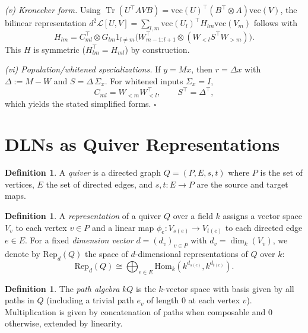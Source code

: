 \documentclass{article}
\theoremstyle{definition}
\newtheorem{definition}[theorem]{Definition}
\begin{document}
\smallskip
\emph{(v) Kronecker form.}
Using $\operatorname{Tr}(U^\top A V B)=\mathrm{vec}(U)^\top(B^\top\!\otimes A)\mathrm{vec}(V)$,
the bilinear representation $d^2\mathcal L[U,V]=\sum_{l,m}\mathrm{vec}(U_l)^\top H_{lm}\mathrm{vec}(V_m)$
follows with
\[
H_{lm}=C_{ml}^\top\!\otimes G_{lm}1_{l\neq m}\big(W_{m-1:l+1}^\top\!\otimes (W_{<l}S^\top W_{>m})\big).
\]
This $H$ is symmetric ($H_{lm}^\top=H_{ml}$) by construction.

\smallskip
\emph{(vi) Population/whitened specializations.}
If $y=Mx$, then $r=\Delta x$ with $\Delta:=M-W$ and $S=\Delta\,\Sigma_x$. For whitened inputs $\Sigma_x=I$,
\[
C_{ml}=W_{<m}W_{<l}^\top,\qquad S^\top=\Delta^\top,
\]
which yields the stated simplified forms. \hfill$\square$
\section{DLNs as Quiver Representations}
\begin{definition}
A \emph{quiver} is a directed graph $Q = (P, E, s, t)$ where $P$ is the set of vertices, $E$ the set of directed edges, and $s,t: E \to P$ are the source and target maps.
\end{definition}

\begin{definition}
A \emph{representation} of a quiver $Q$ over a field $k$ assigns a vector space $V_v$ to each vertex $v \in P$ and a linear map $\phi_e : V_{s(e)} \to V_{t(e)}$ to each directed edge $e \in E$.  
For a fixed \emph{dimension vector} $d = (d_v)_{v \in P}$ with $d_v = \dim_k(V_v)$, we denote by $\mathrm{Rep}_d(Q)$ the space of $d$-dimensional representations of $Q$ over $k$:
\[
    \mathrm{Rep}_d(Q) \cong \bigoplus_{e \in E} \mathrm{Hom}_k(k^{d_{s(e)}}, k^{d_{t(e)}}).
\]
\end{definition}

\begin{definition}
The \emph{path algebra} $kQ$ is the $k$-vector space with basis given by all paths in $Q$ (including a trivial path $e_v$ of length $0$ at each vertex $v$). Multiplication is given by concatenation of paths when composable and $0$ otherwise, extended by linearity.
\end{definition}
\end{document}
